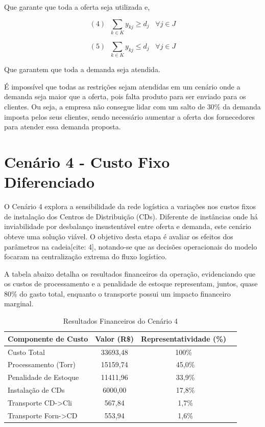 \documentclass[a4paper,11pt]{article}
\begin{document}
Que garante que toda a oferta seja utilizada e,

\[
(4) \; \; \sum_{k \in K} y_{kj} \geq d_j \; \; \; \forall j \in J
\]

\[
(5) \; \; \sum_{k \in K} y_{kj} \leq d_j \; \; \; \forall j \in J
\]

Que garantem que toda a demanda seja atendida. 

É impossível que todas as restrições sejam atendidas em um cenário onde a demanda seja maior que a oferta, pois falta produto para ser enviado para os clientes. Ou seja, a empresa não consegue lidar com um salto de 30\% da demanda imposta pelos seus clientes, sendo necessário aumentar a oferta dos fornecedores para atender essa demanda proposta.

\section{Cenário 4 - Custo Fixo Diferenciado}

O Cenário 4 explora a sensibilidade da rede logística a variações nos custos fixos de instalação dos Centros de Distribuição (CDs). Diferente de instâncias onde há inviabilidade por desbalanço insustentável entre oferta e demanda, este cenário obteve uma solução viável. O objetivo desta etapa é avaliar os efeitos dos parâmetros na cadeia[cite: 4], notando-se que as decisões operacionais do modelo focaram na centralização extrema do fluxo logístico.

A tabela abaixo detalha os resultados financeiros da operação, evidenciando que os custos de processamento e a penalidade de estoque representam, juntos, quase 80\% do gasto total, enquanto o transporte possui um impacto financeiro marginal.

\begin{table}[H]
\centering
\begin{tabular}{lccc}
\hline
\textbf{Componente de Custo} & \textbf{Valor (R\$)} & \textbf{Representatividade (\%)} \\ \hline
Custo Total             & 33693,48  & 100\%     \\
Processamento (Torr)    & 15159,74  & ~45,0\%  \\
Penalidade de Estoque   & 11411,96  & ~33,9\%  \\
Instalação de CDs       &  6000,00  & ~17,8\%  \\
Transporte CD->Cli      &   567,84  & ~1,7\%  \\
Transporte Forn->CD     &   553,94  & ~1,6\%    \\
\hline
\end{tabular}
\caption{Resultados Financeiros do Cenário 4}
\label{tab:cenario4_custos}
\end{table}
\end{document}
